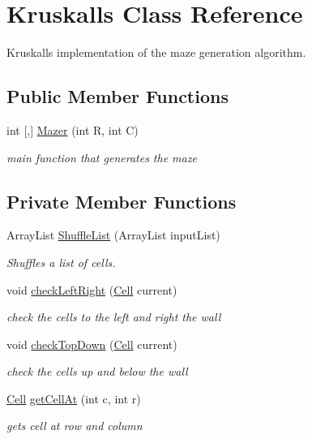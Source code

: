 \hypertarget{class_kruskalls}{}\section{Kruskalls Class Reference}
\label{class_kruskalls}


Kruskall\textquotesingle{}s implementation of the maze generation algorithm.  


\subsection*{Public Member Functions}
\begin{DoxyCompactItemize}
\item 
int \mbox{[},\mbox{]} \mbox{\hyperlink{class_kruskalls_a42db33ed4989df473f51b8bea3df80c9}{Mazer}} (int R, int C)
\begin{DoxyCompactList}\small\item\em main function that generates the maze \end{DoxyCompactList}\end{DoxyCompactItemize}
\subsection*{Private Member Functions}
\begin{DoxyCompactItemize}
\item 
Array\+List \mbox{\hyperlink{class_kruskalls_a73b1ef65b42f134f6f69d394e487c7c5}{Shuffle\+List}} (Array\+List input\+List)
\begin{DoxyCompactList}\small\item\em Shuffles a list of cells. \end{DoxyCompactList}\item 
void \mbox{\hyperlink{class_kruskalls_a0d49a73f9f959a380ee6b89f818e2666}{check\+Left\+Right}} (\mbox{\hyperlink{class_cell}{Cell}} current)
\begin{DoxyCompactList}\small\item\em check the cells to the left and right the wall \end{DoxyCompactList}\item 
void \mbox{\hyperlink{class_kruskalls_a69d7cccf1b3836b574bfa95f031b10e3}{check\+Top\+Down}} (\mbox{\hyperlink{class_cell}{Cell}} current)
\begin{DoxyCompactList}\small\item\em check the cells up and below the wall \end{DoxyCompactList}\item 
\mbox{\hyperlink{class_cell}{Cell}} \mbox{\hyperlink{class_kruskalls_afd439d8f48dbfe50dd810c70ea1a5b15}{get\+Cell\+At}} (int c, int r)
\begin{DoxyCompactList}\small\item\em gets cell at row and column \end{DoxyCompactList}\end{DoxyCompactItemize}
